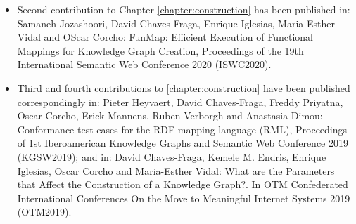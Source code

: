 \begin{itemize}
    \item Second contribution to Chapter \ref{chapter:construction} has been published in: Samaneh Jozashoori, David Chaves-Fraga, Enrique Iglesias, Maria-Esther Vidal and OScar Corcho: FunMap: Efficient Execution of Functional Mappings for Knowledge Graph Creation, Proceedings of the 19th International Semantic Web Conference 2020 (ISWC2020).
    \item Third and fourth contributions to \ref{chapter:construction} have been  published correspondingly in: Pieter Heyvaert, David Chaves-Fraga, Freddy Priyatna, Oscar Corcho, Erick Mannens, Ruben Verborgh and Anastasia Dimou: Conformance test cases for the RDF mapping language (RML), Proceedings of 1st Iberoamerican Knowledge Graphs and Semantic Web Conference 2019 (KGSW2019); and in: David Chaves-Fraga, Kemele M. Endris, Enrique Iglesias, Oscar Corcho and Maria-Esther Vidal: What are the Parameters that Affect the Construction of a Knowledge Graph?. In OTM Confederated International Conferences On the Move to Meaningful Internet Systems 2019 (OTM2019).
\end{itemize}




